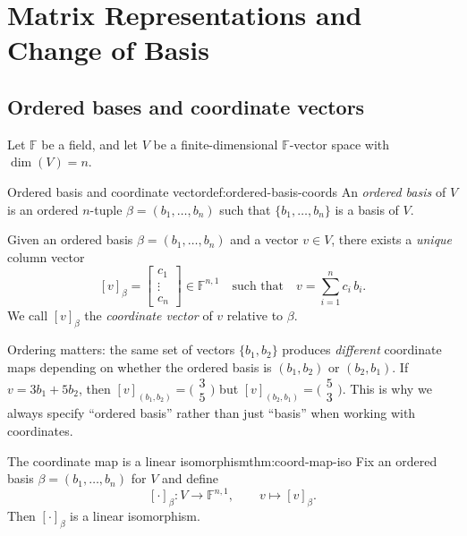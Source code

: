 
\section{Matrix Representations and Change of Basis}

\subsection{Ordered bases and coordinate vectors}

Let $\mathbb{F}$ be a field, and let $V$ be a finite-dimensional $\mathbb{F}$-vector space with $\dim(V)=n$.

\begin{definition}{Ordered basis and coordinate vector}{def:ordered-basis-coords}
An \emph{ordered basis} of $V$ is an ordered $n$-tuple $\beta=(b_1,\dots,b_n)$ such that $\{b_1,\dots,b_n\}$ is a basis of $V$.

Given an ordered basis $\beta=(b_1,\dots,b_n)$ and a vector $v\in V$, there exists a \emph{unique} column vector
\[
[v]_\beta=\begin{bmatrix}c_1\\ \vdots\\ c_n\end{bmatrix}\in \mathbb{F}^{n,1}
\quad\text{such that}\quad
v=\sum_{i=1}^n c_i\,b_i.
\]
We call $[v]_\beta$ the \emph{coordinate vector} of $v$ relative to $\beta$.
\end{definition}

Ordering matters: the same set of vectors $\{b_1,b_2\}$ produces \emph{different} coordinate maps depending on whether the ordered basis is $(b_1,b_2)$ or $(b_2,b_1)$.
If $v=3b_1+5b_2$, then $[v]_{(b_1,b_2)}=\bigl(\begin{smallmatrix}3\\5\end{smallmatrix}\bigr)$ but $[v]_{(b_2,b_1)}=\bigl(\begin{smallmatrix}5\\3\end{smallmatrix}\bigr)$.
This is why we always specify ``ordered basis'' rather than just ``basis'' when working with coordinates.

\begin{theorem}{The coordinate map is a linear isomorphism}{thm:coord-map-iso}
Fix an ordered basis $\beta=(b_1,\dots,b_n)$ for $V$ and define
\[
[\cdot]_\beta:V\to \mathbb{F}^{n,1},\qquad v\mapsto [v]_\beta.
\]
Then $[\cdot]_\beta$ is a linear isomorphism.
\end{theorem}

